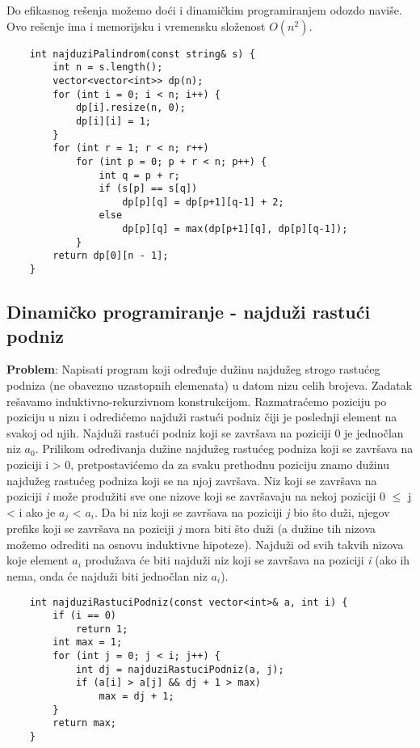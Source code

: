 \documentclass{article}
\begin{document}
Do efikasnog rešenja možemo doći i dinamičkim programiranjem odozdo naviše. Ovo rešenje ima i memorijsku i vremensku složenost $O(n^2)$.
\begin{lstlisting}
    int najduziPalindrom(const string& s) {
        int n = s.length();
        vector<vector<int>> dp(n);
        for (int i = 0; i < n; i++) {
            dp[i].resize(n, 0);
            dp[i][i] = 1;
        }
        for (int r = 1; r < n; r++)
            for (int p = 0; p + r < n; p++) {
                int q = p + r;
                if (s[p] == s[q])
                    dp[p][q] = dp[p+1][q-1] + 2;
                else
                    dp[p][q] = max(dp[p+1][q], dp[p][q-1]);
            }
        return dp[0][n - 1];
    }
\end{lstlisting}

\subsection{Dinamičko programiranje - najduži rastući podniz}
\textbf{Problem}: Napisati program koji određuje dužinu najdužeg strogo rastućeg
podniza (ne obavezno uzastopnih elemenata) u datom nizu celih brojeva.
\newline
Zadatak rešavamo induktivno-rekurzivnom konstrukcijom. Razmatraćemo poziciju po poziciju u nizu i odredićemo
najduži rastući podniz čiji je poslednji element na svakoj od njih. Najduži
rastući podniz koji se završava na poziciji 0 je jednočlan niz $a_0$. Prilikom
određivanja dužine najdužeg rastućeg podniza koji se završava na poziciji
i > 0, pretpostavićemo da za svaku prethodnu poziciju znamo dužinu najdužeg
rastućeg podniza koji se na njoj završava. Niz koji se završava na poziciji \textit{i} može
produžiti sve one nizove koji se završavaju na nekoj poziciji 
0 $\leq$ j < i ako je
$a_j$ < $a_i$. Da bi niz koji se završava na poziciji \textit{j} bio što duži, njegov prefiks koji
se završava na poziciji \textit{j} mora biti što duži (a dužine tih nizova možemo odrediti
na osnovu induktivne hipoteze). Najduži od svih takvih nizova koje element $a_i$
produžava će biti najduži niz koji se završava na poziciji \textit{i} (ako ih nema, onda će
najduži biti jednočlan niz $a_i$).
\begin{lstlisting}
    int najduziRastuciPodniz(const vector<int>& a, int i) {
        if (i == 0)
            return 1;
        int max = 1;
        for (int j = 0; j < i; j++) {
            int dj = najduziRastuciPodniz(a, j);
            if (a[i] > a[j] && dj + 1 > max)
                max = dj + 1;
        }
        return max;
    }
\end{lstlisting}
\end{document}
